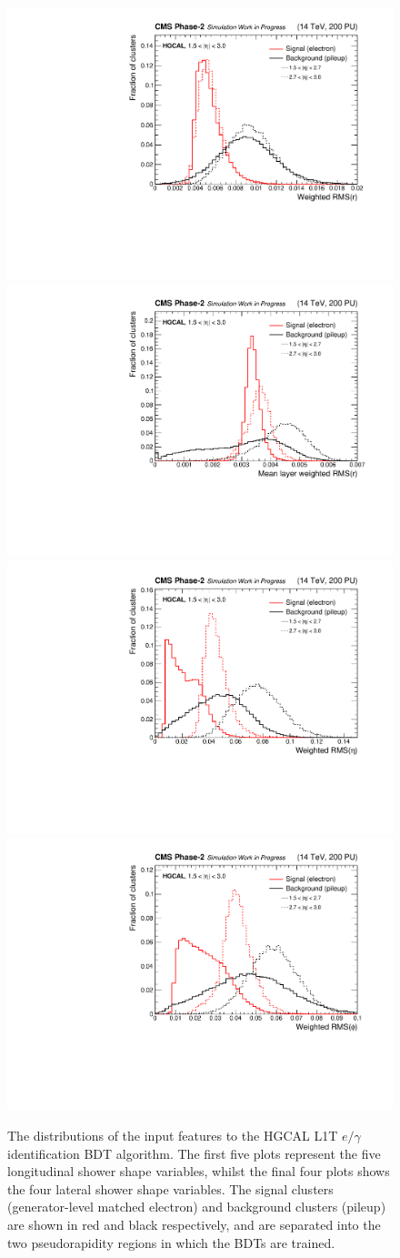 \begin{figure}[htb!]
  \includegraphics[width=.32\textwidth]{Figures/cms/egid/cl3d_srrtot.pdf}
  \includegraphics[width=.32\textwidth]{Figures/cms/egid/cl3d_srrmean.pdf}
  \includegraphics[width=.32\textwidth]{Figures/cms/egid/cl3d_seetot.pdf}
  \includegraphics[width=.32\textwidth]{Figures/cms/egid/cl3d_spptot.pdf}
  \caption[$e/\gamma$ identification input feature distributions]
  {
    The distributions of the input features to the HGCAL L1T $e/\gamma$ identification BDT algorithm. The first five plots represent the five longitudinal shower shape variables, whilst the final four plots shows the four lateral shower shape variables. The signal clusters (generator-level matched electron) and background clusters (pileup) are shown in red and black respectively, and are separated into the two pseudorapidity regions in which the BDTs are trained.
  }
  \label{fig:egid_all_features}
\end{figure}